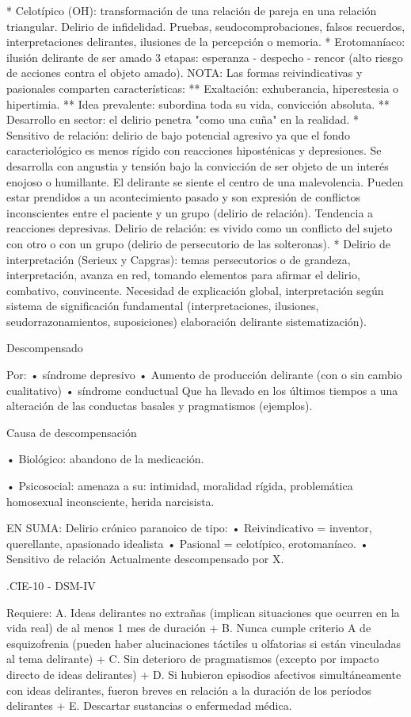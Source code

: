 * Celotípico (OH): transformación de una relación de pareja en una relación triangular. Delirio de infidelidad. Pruebas, seudocomprobaciones, falsos recuerdos, interpretaciones delirantes, ilusiones de la percepción o memoria.
* Erotomaníaco: ilusión delirante de ser amado 3 etapas: esperanza - despecho - rencor (alto riesgo de acciones contra el objeto amado). NOTA: Las formas reivindicativas y pasionales comparten características:
** Exaltación: exhuberancia, hiperestesia o hipertimia.
** Idea prevalente: subordina toda su vida, convicción absoluta.
** Desarrollo en sector: el delirio penetra "como una cuña" en la realidad.
* Sensitivo de relación: delirio de bajo potencial agresivo ya que el fondo caracteriológico es menos rígido con reacciones hiposténicas y depresiones. Se desarrolla con angustia y tensión bajo la convicción de ser objeto de un interés enojoso o humillante. El delirante se siente el centro de una malevolencia. Pueden estar prendidos a un acontecimiento pasado y son expresión de conflictos inconscientes entre el paciente y un grupo (delirio de relación). Tendencia a reacciones depresivas. Delirio de relación: es vivido como un conflicto del sujeto con otro o con un grupo (delirio de persecutorio de las solteronas).
* Delirio de interpretación (Serieux y Capgras): temas persecutorios o de grandeza, interpretación, avanza en red, tomando elementos para afirmar el delirio, combativo, convincente. Necesidad de explicación global, interpretación según sistema de significación fundamental (interpretaciones, ilusiones, seudorrazonamientos, suposiciones) elaboración delirante sistematización).

Descompensado

Por: • síndrome depresivo • Aumento de producción delirante (con o sin cambio cualitativo) • síndrome conductual Que ha llevado en los últimos tiempos a una alteración de las conductas basales y pragmatismos (ejemplos).

Causa de descompensación

• Biológico: abandono de la medicación.

• Psicosocial: amenaza a su: intimidad, moralidad rígida, problemática homosexual inconsciente, herida narcisista.

EN SUMA: Delirio crónico paranoico de tipo: • Reivindicativo = inventor, querellante, apasionado idealista • Pasional = celotípico, erotomaníaco. • Sensitivo de relación Actualmente descompensado por X.

.CIE-10 - DSM-IV

Requiere:
A. Ideas delirantes no extrañas (implican situaciones que ocurren en la vida real) de al menos 1 mes de duración +
B. Nunca cumple criterio A de esquizofrenia (pueden haber alucinaciones táctiles u olfatorias si están vinculadas al tema delirante) +
C. Sin deterioro de pragmatismos (excepto por impacto directo de ideas delirantes) +
D. Si hubieron episodios afectivos simultáneamente con ideas delirantes, fueron breves en relación a la duración de los períodos delirantes +
E. Descartar sustancias o enfermedad médica.

